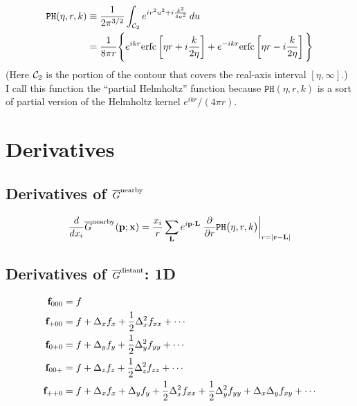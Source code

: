 \documentclass[letterpaper]{article}
\newcommand{\GB}{\overline{G}}
\newcommand{\erfc}{\text{erfc}}
\begin{document}
\begin{align}
  \texttt{PH}(\eta,r,k)
  &\equiv
  \frac{1}{2\pi^{3/2}}
  \int_{\mc C_2} e^{ ir^2 u^2 + i\frac{k^2}{4u^2}}\, du
\nn
  &=
   \frac{1}{8\pi r}
     \Bigg\{ e^{ ikr} \erfc\left[  \eta r
                                 +i\frac{k}{2\eta}\right]
            +e^{-ikr} \erfc\left[  \eta r 
                                 -i\frac{k}{2\eta}\right]
     \Bigg\}
  \label{PHDefinition}
\end{align}
(Here $\mathcal{C}_2$ is the portion of the contour that 
covers the real-axis interval $[\eta,\infty]$.)
I call this function the ``partial Helmholtz'' function 
because $\texttt{PH}(\eta, r, k)$ is a sort of partial
version of the Helmholtz kernel $e^{ikr}/(4\pi r).$

\section{Derivatives}

\subsection{Derivatives of $\GB\sups{nearby}$}

\begin{align*}
 \frac{d}{dx_i} \GB\sups{nearby}(\vb p; \vb x)
& = \frac{x_i}{r} \sum_{\vb L} 
    e^{i \vb p \cdot \vb L}
    \left. \pard{}{r} \texttt{PH}\big(\eta, r, k\big)
    \right|_{r=|\vb r - \vb L|}
\\
\end{align*}

\subsection{Derivatives of $\GB\sups{distant}$: 1D}

\begin{align*}
 \mathbf{f}_{000} &= f \\
 \mathbf{f}_{+00} &= f + \Delta_x f_x + \frac{1}{2}\Delta_x^2 f_{xx} + \cdots \\
 \mathbf{f}_{0+0} &= f + \Delta_y f_y + \frac{1}{2}\Delta_y^2 f_{yy} + \cdots \\
 \mathbf{f}_{00+} &= f + \Delta_z f_z + \frac{1}{2}\Delta_z^2 f_{zz} + \cdots \\
 \mathbf{f}_{++0} &= f + \Delta_x f_x + \Delta_y f_y 
                  + \frac{1}{2}\Delta_x^2 f_{xx} 
                  + \frac{1}{2}\Delta_y^2 f_{yy} 
                  + \Delta_x \Delta_y f_{xy} + \cdots 
\\
\end{align*}
\end{document}

